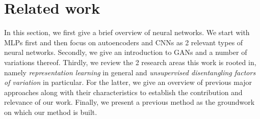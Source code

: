 \documentclass[12pt,a4paper]{article}
\begin{document}
\section{Related work}\label{sec:related_work}
In this section, we first give a brief overview of neural networks. We start with MLPs first and then focus on autoencoders and CNNs as 2 relevant types of neural networks. Secondly, we give an introduction to GANs and a number of variations thereof. Thirdly, we review the 2 research areas this work is rooted in, namely \textit{representation learning} in general and \textit{unsupervised disentangling factors of variation} in particular. For the latter, we give an overview of previous major approaches along with their characteristics to establish the contribution and relevance of our work. Finally, we present a previous method as the groundwork on which our method is built.
\end{document}

